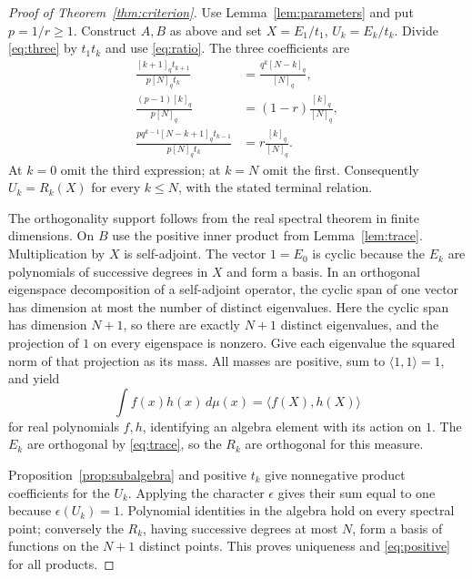 \documentclass[11pt]{article}
\begin{document}
\begin{proof}[Proof of Theorem~\ref{thm:criterion}]
Use Lemma~\ref{lem:parameters} and put $p=1/r\geq1$. Construct $A,B$ as above and set $X=E_1/t_1$, $U_k=E_k/t_k$. Divide \eqref{eq:three} by $t_1t_k$ and use \eqref{eq:ratio}. The three coefficients are
\begin{align*}
\frac{[k+1]_qt_{k+1}}{p[N]_qt_k}
&=\frac{q^k[N-k]_q}{[N]_q},\\
\frac{(p-1)[k]_q}{p[N]_q}&=(1-r)\frac{[k]_q}{[N]_q},\\
\frac{pq^{k-1}[N-k+1]_qt_{k-1}}{p[N]_qt_k}
&=r\frac{[k]_q}{[N]_q}.
\end{align*}
At $k=0$ omit the third expression; at $k=N$ omit the first. Consequently $U_k=R_k(X)$ for every $k\leq N$, with the stated terminal relation.

The orthogonality support follows from the real spectral theorem in finite dimensions. On $B$ use the positive inner product from Lemma~\ref{lem:trace}. Multiplication by $X$ is self-adjoint. The vector $1=E_0$ is cyclic because the $E_k$ are polynomials of successive degrees in $X$ and form a basis. In an orthogonal eigenspace decomposition of a self-adjoint operator, the cyclic span of one vector has dimension at most the number of distinct eigenvalues. Here the cyclic span has dimension $N+1$, so there are exactly $N+1$ distinct eigenvalues, and the projection of $1$ on every eigenspace is nonzero. Give each eigenvalue the squared norm of that projection as its mass. All masses are positive, sum to $\langle1,1\rangle=1$, and yield
\[
\int f(x)h(x)\,d\mu(x)=\langle f(X),h(X)\rangle
\]
for real polynomials $f,h$, identifying an algebra element with its action on $1$. The $E_k$ are orthogonal by \eqref{eq:trace}, so the $R_k$ are orthogonal for this measure.

Proposition~\ref{prop:subalgebra} and positive $t_k$ give nonnegative product coefficients for the $U_k$. Applying the character $\epsilon$ gives their sum equal to one because $\epsilon(U_k)=1$. Polynomial identities in the algebra hold on every spectral point; conversely the $R_k$, having successive degrees at most $N$, form a basis of functions on the $N+1$ distinct points. This proves uniqueness and \eqref{eq:positive} for all products.
\end{proof}
\end{document}

